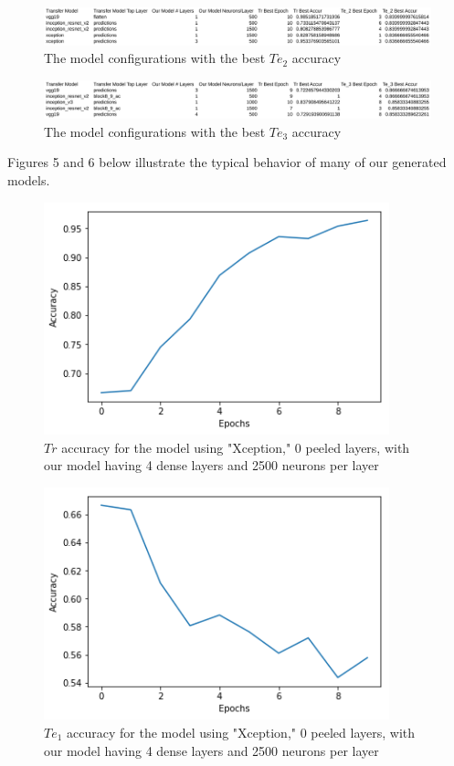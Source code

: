 \documentclass{article}
\begin{document}
\begin{figure}[h!]
	\centering
	\includegraphics[width=160mm]{results_te_2.png}
	\caption{The model configurations with the best $ Te_2 $ accuracy}
\end{figure}

\begin{figure}[h!]
	\centering
	\includegraphics[width=160mm]{results_te_3.png}
	\caption{The model configurations with the best $ Te_3 $ accuracy}
\end{figure}

Figures 5 and 6 below illustrate the typical behavior of many of our generated models.

\begin{figure}[h!]
	\centering
	\includegraphics[width=100mm]{xception_0_4_2500_training_accur.png}
	\caption{$ Tr $ accuracy for the model using "Xception," 0 peeled layers, with our model having 4 dense layers and 2500 neurons per layer}
\end{figure}

\begin{figure}[h!]
	\centering
	\includegraphics[width=100mm]{xception_0_4_2500_test_accur.png}
	\caption{$ Te_1 $ accuracy for the model using "Xception," 0 peeled layers, with our model having 4 dense layers and 2500 neurons per layer}
\end{figure}
\end{document}
